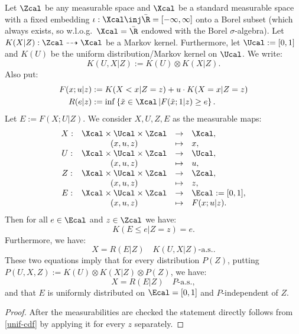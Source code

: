 \begin{Thm}
    \label{ccdf2}
    Let $\Zcal$ be any measurable space and $\Xcal$ be a standard measurable space with a fixed embedding $\iota: \Xcal \inj \bar\R=[-\infty,\infty]$ onto a Borel subset (which always exists, so w.l.o.g.\ $\Xcal = \bar\R$ endowed with the Borel $\sigma$-algebra).
    Let $K(X|Z) : \Zcal \dasharrow \Xcal$ be a Markov kernel.
    Furthermore, let $\Ucal:=[0,1]$ and $K(U)$ be the uniform distribution/Markov kernel on $\Ucal$. We write:
    \[ K(U,X|Z) := K(U)\otimes K(X|Z).\]
Also put:
\begin{align*}
    F(x;u|z) &:= K(X<x|Z=z) + u \cdot K(X=x|Z=z)\\
	R(e|z) &:= \inf \left\{ \tilde{x} \in \Xcal\,| F(\tilde{x};1|z) \ge e \right\}.
\end{align*}
Let $E:= F(X;U|Z)$. We consider $X,U,Z,E$  as the measurable maps:
\[\begin{array}{cccl}
    X: & \Xcal \times \Ucal \times \Zcal &\to& \Xcal,\\
     & (x,u,z) &\mapsto& x,\\
    U: & \Xcal \times \Ucal \times \Zcal &\to& \Ucal,\\
     & (x,u,z) &\mapsto& u,\\
    Z: & \Xcal \times \Ucal \times \Zcal &\to& \Zcal,\\
     & (x,u,z) &\mapsto& z,\\
    E: & \Xcal \times \Ucal \times \Zcal &\to& \Ecal:=[0,1],\\
     & (x,u,z) &\mapsto& F(x;u|z).
\end{array}\]%
%
Then for all $e \in \Ecal$ and $z \in \Zcal$ we have:
\[ K( E \le e | Z=z ) = e. \]
Furthermore, we have:
\[ X = R(E|Z) \quad K(U,X|Z)\text{-a.s.}.\]
These two equations imply that for every distribution $P(Z)$, putting $P(U,X,Z):=K(U)\otimes K(X|Z)\otimes P(Z)$, we have:
\[ X = R(E|Z) \quad P\text{-a.s.},\]
and that $E$ is uniformly distributed on $\Ecal=[0,1]$ and $P$-independent of $Z$.
\begin{proof}
    After the measurabilities are checked the statement directly follows from \ref{unif-cdf} by applying it for every $z$ separately.

\end{proof}
\end{Thm}
